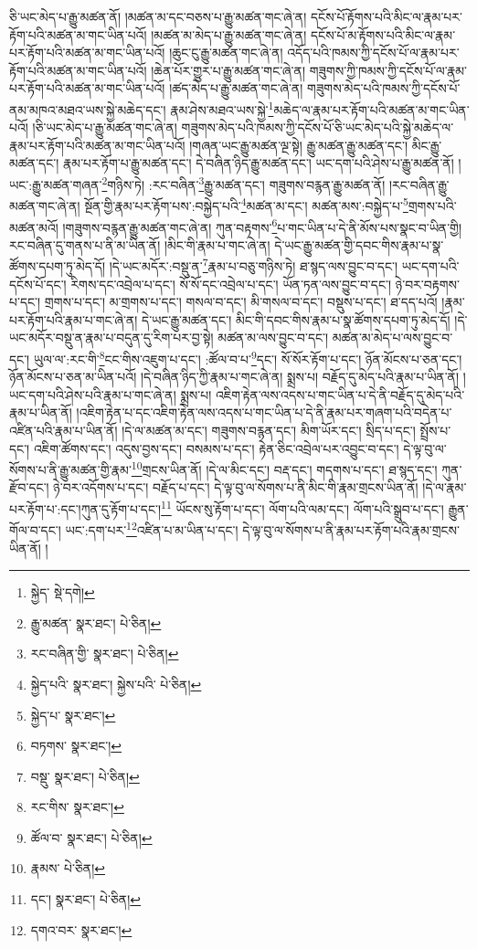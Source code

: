 ཅི་ཡང་མེད་པ་རྒྱུ་མཚན་ནོ། །མཚན་མ་དང་བཅས་པ་རྒྱུ་མཚན་གང་ཞེ་ན། དངོས་པོ་རྟོགས་པའི་མིང་ལ་རྣམ་པར་རྟོག་པའི་མཚན་མ་གང་ཡིན་པའོ། །མཚན་མ་མེད་པ་རྒྱུ་མཚན་གང་ཞེ་ན། དངོས་པོ་མ་རྟོགས་པའི་མིང་ལ་རྣམ་པར་རྟོག་པའི་མཚན་མ་གང་ཡིན་པའོ། །ཆུང་ངུ་རྒྱུ་མཚན་གང་ཞེ་ན། འདོད་པའི་ཁམས་ཀྱི་དངོས་པོ་ལ་རྣམ་པར་རྟོག་པའི་མཚན་མ་གང་ཡིན་པའོ། །ཆེན་པོར་གྱུར་པ་རྒྱུ་མཚན་གང་ཞེ་ན། གཟུགས་ཀྱི་ཁམས་ཀྱི་དངོས་པོ་ལ་རྣམ་པར་རྟོག་པའི་མཚན་མ་གང་ཡིན་པའོ། །ཚད་མེད་པ་རྒྱུ་མཚན་གང་ཞེ་ན། གཟུགས་མེད་པའི་ཁམས་ཀྱི་དངོས་པོ་ནམ་མཁའ་མཐའ་ཡས་སྐྱེ་མཆེད་དང་། རྣམ་ཤེས་མཐའ་ཡས་སྐྱེ་\footnote{སྐྱེད་  སྡེ་དགེ། }མཆེད་ལ་རྣམ་པར་རྟོག་པའི་མཚན་མ་གང་ཡིན་པའོ། །ཅི་ཡང་མེད་པ་རྒྱུ་མཚན་གང་ཞེ་ན། གཟུགས་མེད་པའི་ཁམས་ཀྱི་དངོས་པོ་ཅི་ཡང་མེད་པའི་སྐྱེ་མཆེད་ལ་རྣམ་པར་རྟོག་པའི་མཚན་མ་གང་ཡིན་པའོ། །གཞན་ཡང་རྒྱུ་མཚན་ལྔ་སྟེ། རྒྱུ་མཚན་རྒྱུ་མཚན་དང་། མིང་རྒྱུ་མཚན་དང་། རྣམ་པར་རྟོག་པ་རྒྱུ་མཚན་དང་། དེ་བཞིན་ཉིད་རྒྱུ་མཚན་དང་། ཡང་དག་པའི་ཤེས་པ་རྒྱུ་མཚན་ནོ། །ཡང་:རྒྱུ་མཚན་གཞན་\footnote{རྒྱུ་མཚན་  སྣར་ཐང་།  པེ་ཅིན། }གཉིས་ཏེ། :རང་བཞིན་\footnote{རང་བཞིན་གྱི་  སྣར་ཐང་།  པེ་ཅིན། }རྒྱུ་མཚན་དང་། གཟུགས་བརྙན་རྒྱུ་མཚན་ནོ། །རང་བཞིན་རྒྱུ་མཚན་གང་ཞེ་ན། སྔོན་གྱི་རྣམ་པར་རྟོག་པས་:བསྐྱེད་པའི་\footnote{སྐྱེད་པའི་  སྣར་ཐང་། སྐྱེས་པའི་  པེ་ཅིན། }མཚན་མ་དང་། མཚན་མས་:བསྐྱེད་པ་\footnote{སྐྱེད་པ་  སྣར་ཐང་། }གྲགས་པའི་མཚན་མའོ། །གཟུགས་བརྙན་རྒྱུ་མཚན་གང་ཞེ་ན། ཀུན་བརྟགས་\footnote{བཏགས་  སྣར་ཐང་། }པ་གང་ཡིན་པ་དེ་ནི་མོས་པས་སྣང་བ་ཡིན་གྱི། རང་བཞིན་དུ་གནས་པ་ནི་མ་ཡིན་ནོ། །མིང་གི་རྣམ་པ་གང་ཞེ་ན། དེ་ཡང་རྒྱུ་མཚན་གྱི་དབང་གིས་རྣམ་པ་སྣ་ཚོགས་དཔག་ཏུ་མེད་དོ། །དེ་ཡང་མདོར་:བསྡུ་ན་\footnote{བསྡུ་  སྣར་ཐང་།  པེ་ཅིན། }རྣམ་པ་བཅུ་གཉིས་ཏེ། ཐ་སྙད་ལས་བྱུང་བ་དང་། ཡང་དག་པའི་དངོས་པོ་དང་། རིགས་དང་འབྲེལ་པ་དང་། སོ་སོ་དང་འབྲེལ་པ་དང་། ཡོན་ཏན་ལས་བྱུང་བ་དང་། ཉེ་བར་བརྟགས་པ་དང་། གྲགས་པ་དང་། མ་གྲགས་པ་དང་། གསལ་བ་དང་། མི་གསལ་བ་དང་། བསྡུས་པ་དང་། ཐ་དད་པའོ། །རྣམ་པར་རྟོག་པའི་རྣམ་པ་གང་ཞེ་ན། དེ་ཡང་རྒྱུ་མཚན་དང་། མིང་གི་དབང་གིས་རྣམ་པ་སྣ་ཚོགས་དཔག་ཏུ་མེད་དོ། །དེ་ཡང་མདོར་བསྡུ་ན་རྣམ་པ་བདུན་དུ་རིག་པར་བྱ་སྟེ། མཚན་མ་ལས་བྱུང་བ་དང་། མཚན་མ་མེད་པ་ལས་བྱུང་བ་དང་། ཡུལ་ལ་:རང་གི་\footnote{རང་གིས་  སྣར་ཐང་། }ངང་གིས་འཇུག་པ་དང་། :ཚོལ་བ་པ་\footnote{ཚོལ་བ་  སྣར་ཐང་།  པེ་ཅིན། }དང་། སོ་སོར་རྟོག་པ་དང་། ཉོན་མོངས་པ་ཅན་དང་། ཉོན་མོངས་པ་ཅན་མ་ཡིན་པའོ། །དེ་བཞིན་ཉིད་ཀྱི་རྣམ་པ་གང་ཞེ་ན། སྨྲས་པ། བརྗོད་དུ་མེད་པའི་རྣམ་པ་ཡིན་ནོ། །ཡང་དག་པའི་ཤེས་པའི་རྣམ་པ་གང་ཞེ་ན། སྨྲས་པ། འཇིག་རྟེན་ལས་འདས་པ་གང་ཡིན་པ་དེ་ནི་བརྗོད་དུ་མེད་པའི་རྣམ་པ་ཡིན་ནོ། །འཇིག་རྟེན་པ་དང་འཇིག་རྟེན་ལས་འདས་པ་གང་ཡིན་པ་དེ་ནི་རྣམ་པར་གཞག་པའི་བདེན་པ་འཛིན་པའི་རྣམ་པ་ཡིན་ནོ། །དེ་ལ་མཚན་མ་དང་། གཟུགས་བརྙན་དང་། མིག་ཡོར་དང་། སྲིད་པ་དང་། སྤྲོས་པ་དང་། འཇིག་ཚོགས་དང་། འདུས་བྱས་དང་། བསམས་པ་དང་། རྟེན་ཅིང་འབྲེལ་པར་འབྱུང་བ་དང་། དེ་ལྟ་བུ་ལ་སོགས་པ་ནི་རྒྱུ་མཚན་གྱི་རྣམ་\footnote{རྣམས་  པེ་ཅིན། }གྲངས་ཡིན་ནོ། །དེ་ལ་མིང་དང་། བརྡ་དང་། གདགས་པ་དང་། ཐ་སྙད་དང་། ཀུན་རྫོབ་དང་། ཉེ་བར་འདོགས་པ་དང་། བརྗོད་པ་དང་། དེ་ལྟ་བུ་ལ་སོགས་པ་ནི་མིང་གི་རྣམ་གྲངས་ཡིན་ནོ། །དེ་ལ་རྣམ་པར་རྟོག་པ་:དང་།ཀུན་དུ་རྟོག་པ་དང་།\footnote{དང་།  སྣར་ཐང་།  པེ་ཅིན། } ཡོངས་སུ་རྟོག་པ་དང་། ལོག་པའི་ལམ་དང་། ལོག་པའི་སྒྲུབ་པ་དང་། རྒྱུན་གོལ་བ་དང་། ཡང་:དག་པར་\footnote{དགའ་བར་  སྣར་ཐང་། }འཛིན་པ་མ་ཡིན་པ་དང་། དེ་ལྟ་བུ་ལ་སོགས་པ་ནི་རྣམ་པར་རྟོག་པའི་རྣམ་གྲངས་ཡིན་ནོ། །
